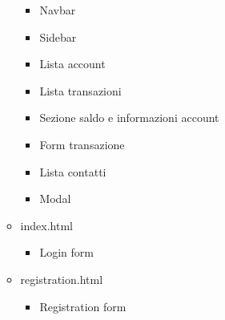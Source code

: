 \documentclass{article}
\begin{document}
\begin{itemize}
\begin{itemize}
\begin{itemize}
			\item Navbar
			\item Sidebar
			\item Lista account
			\item Lista transazioni
			\item Sezione saldo e informazioni account
			\item Form transazione
			\item Lista contatti
			\item Modal
		\end{itemize}
		\item index.html
		\begin{itemize}
			\item Login form
		\end{itemize}
		\item registration.html
		\begin{itemize}
			\item Registration form
		\end{itemize}
	\end{itemize}
\end{itemize}
\end{document}
